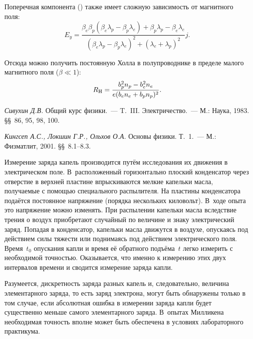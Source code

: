 \begin{lab:example}
Поперечная компонента () также имеет сложную
зависимость от магнитного поля:
\[
E_y = \frac{\beta_e\beta_p(\beta_e\lambda_p-\beta_p\lambda_e)+
    \beta_p \lambda_p -\beta_e \lambda_e}%
{(\beta_e \lambda_p - \beta_p \lambda_e)^2 + (\lambda_e+\lambda_p)^2} j.
\]

Отсюда можно получить постоянную Холла в полупроводнике в пределе малого
магнитного поля ($\beta \ll 1$):
\begin{equation}
    \eqmark{3.21}
    R_{\rm H} = \frac{b_p^2 n_p - b_e^2 n_e}%
{e(b_en_e+b_pn_p)^2}.
\end{equation}
\end{lab:example}


\begin{lab:literature}
    \item{ \textit{Сивухин Д.В.} Общий курс физики.~--- T.~III.
Электричество.~---
М.: Наука, 1983. \S\S~86, 95, 98, 100.}
    \item{ \textit{Кингсеп А.С., Локшин Г.Р., Ольхов О.А.} Основы физики.
Т.~1.~--- М.: Физматлит, 2001. \S\S~8.1--8.3.}
\end{lab:literature}


Измерение заряда капель производится путём исследования их движения в
электрическом поле. В~расположенный горизонтально плоский конденсатор через
отверстие в верхней пластине впрыскиваются мелкие капельки масла, получаемые с
помощью специального распылителя. На пластины конденсатора подаётся постоянное
напряжение (порядка нескольких киловольт). В~ходе опыта это напряжение можно
изменять. При распылении капельки масла вследствие трения о воздух приобретают
случайный по величине и знаку электрический заряд. Попадая в конденсатор,
капельки масла движутся в воздухе, опускаясь под действием силы тяжести или
поднимаясь под действием электрического поля. Время~$t_0$ опускания капли и
время её обратного подъёма~$t$ легко измерить с необходимой точностью.
Оказывается, что именно к измерению этих двух интервалов времени и сводится
измерение заряда капли.

Разумеется, дискретность заряда разных капель и, следовательно, величина
элементарного заряда, то есть заряд электрона, могут быть обнаружены только в
том случае, если абсолютная ошибка в измерении заряда капли будет существенно
меньше самого элементарного заряда. В~опытах Милликена необходимая точность
вполне может быть обеспечена в условиях лабораторного практикума.
\todo[inline,color=cyan]{<---}


